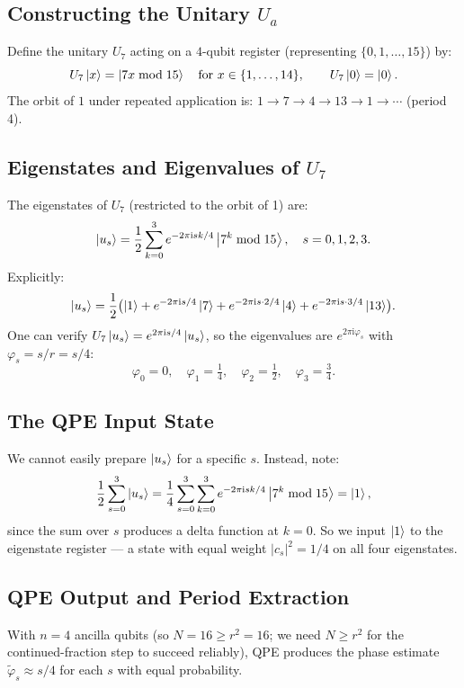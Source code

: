 \documentclass[12pt,a4paper]{article}
\newcommand{\QPE}{\textsc{QPE}}
\newcommand{\ii}{\mathrm{i}}
\begin{document}
\subsection{Constructing the Unitary \texorpdfstring{$U_a$}{Ua}}

Define the unitary $U_7$ acting on a $4$-qubit register
(representing $\{0,1,\ldots,15\}$) by:
\[
  U_7\Ket{x} = \Ket{7x \bmod 15} \quad \text{for } x \in \{1,\ldots,14\},
  \qquad
  U_7\Ket{0} = \Ket{0}.
\]
The orbit of $1$ under repeated application is:
$1 \to 7 \to 4 \to 13 \to 1 \to \cdots$ (period 4).

\subsection{Eigenstates and Eigenvalues of \texorpdfstring{$U_7$}{U7}}

The eigenstates of $U_7$ (restricted to the orbit of 1) are:
\[
  \Ket{u_s} = \frac{1}{2}\sum_{k=0}^{3} e^{-2\pi\ii sk/4}\Ket{7^k\bmod 15},
  \quad s = 0,1,2,3.
\]
Explicitly:
\[
  \Ket{u_s} = \frac{1}{2}\bigl(
    \Ket{1} + e^{-2\pi\ii s/4}\Ket{7} + e^{-2\pi\ii s\cdot 2/4}\Ket{4}
    + e^{-2\pi\ii s\cdot 3/4}\Ket{13}
  \bigr).
\]
One can verify $U_7\Ket{u_s} = e^{2\pi\ii s/4}\Ket{u_s}$, so the
eigenvalues are $e^{2\pi\ii\varphi_s}$ with $\varphi_s = s/r = s/4$:
\[
  \varphi_0 = 0, \quad \varphi_1 = \tfrac{1}{4}, \quad \varphi_2 = \tfrac{1}{2}, \quad \varphi_3 = \tfrac{3}{4}.
\]

\subsection{The QPE Input State}

We cannot easily prepare $\Ket{u_s}$ for a specific $s$.  Instead, note:
\[
  \frac{1}{2}\sum_{s=0}^3 \Ket{u_s}
  = \frac{1}{4}\sum_{s=0}^3\sum_{k=0}^3 e^{-2\pi\ii sk/4}\Ket{7^k\bmod 15}
  = \Ket{1},
\]
since the sum over $s$ produces a delta function at $k=0$.  So we input
$\Ket{1}$ to the eigenstate register — a state with equal weight $|c_s|^2 = 1/4$
on all four eigenstates.

\subsection{QPE Output and Period Extraction}

With $n = 4$ ancilla qubits (so $N = 16 \geq r^2 = 16$; we need $N \geq r^2$
for the continued-fraction step to succeed reliably), \QPE{} produces the
phase estimate $\tilde\varphi_s \approx s/4$ for each $s$ with equal probability.
\end{document}
